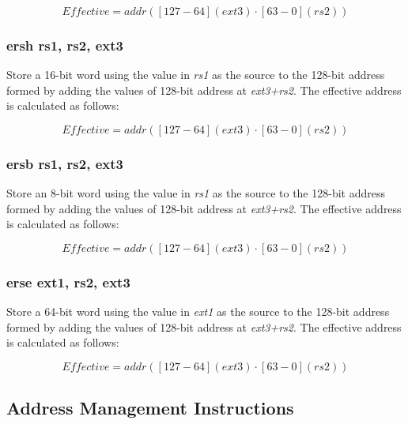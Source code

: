 \documentclass{article}
\begin{document}
\begin{equation}
Effective = addr([127-64](ext3) \cdot [63-0](rs2))
\end{equation}

\subsubsection{ersh rs1, rs2, ext3}

Store a 16-bit word using the value in \textit{rs1} as the source 
to the 128-bit address formed by adding the values of
128-bit address at \textit{ext3+rs2}.  The effective address is calculated 
as follows: 

\begin{equation}
Effective = addr([127-64](ext3) \cdot [63-0](rs2))
\end{equation}

\subsubsection{ersb rs1, rs2, ext3}

Store an 8-bit word using the value in \textit{rs1} as the source 
to the 128-bit address formed by adding the values of
128-bit address at \textit{ext3+rs2}.  The effective address is calculated 
as follows: 

\begin{equation}
Effective = addr([127-64](ext3) \cdot [63-0](rs2))
\end{equation}

\subsubsection{erse ext1, rs2, ext3}

Store a 64-bit word using the value in \textit{ext1} as the source 
to the 128-bit address formed by adding the values of
128-bit address at \textit{ext3+rs2}.  The effective address is calculated 
as follows: 

\begin{equation}
Effective = addr([127-64](ext3) \cdot [63-0](rs2))
\end{equation}

\subsection{Address Management Instructions}
\label{sec:AddressManagementInstructions}
\end{document}
